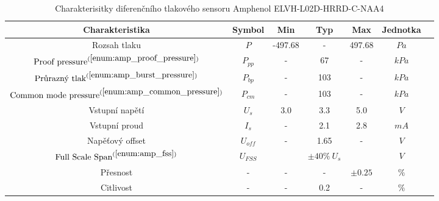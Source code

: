 \begin{table}[H]
    \label{tab:amphenol_properies}
    \caption{Charakterisitky diferenčního tlakového sensoru Amphenol ELVH-L02D-HRRD-C-NAA4 \cite{cite:Allsensors}}
    \centering
    \begin{ctucolortab}
        \begin{tabular}{ccccccc}
            \toprule
            Charakteristika                                                         & Symbol    & Min     & Typ               & Max         & Jednotka & \\ \midrule
            Rozsah tlaku                                                            & $P$       & -497.68 & -                 & 497.68      & $Pa$     & \\
            $\textnormal{Proof pressure}^{(\ref{enum:amp_proof_pressure})}$         & $P_{pp}$  & -       & 67                & -           & $kPa$    & \\
            $\textnormal{Průrazný tlak}^{(\ref{enum:amp_burst_pressure}) }$         & $P_{bp}$  & -       & 103               & -           & $kPa$    & \\
            $\textnormal{Common mode pressure}^{(\ref{enum:amp_common_pressure})} $ & $P_{cm}$  & -       & 103               & -           & $kPa$    & \\
            Vstupní napětí                                                          & $U_{s}$   & 3.0     & 3.3               & 5.0         & $V$      & \\
            Vstupní proud                                                           & $I_{s}$   & -       & 2.1               & 2.8         & $mA$     & \\
            Napěťový offset                                                         & $U_{off}$ & -       & 1.65              & -           & $V$      & \\
            $\textnormal{Full Scale Span}^{(\ref{enum:amp_fss})} $                  & $U_{FSS}$ &         & $\pm 40 \% \ U_s$ &             & $V$      & \\
            Přesnost                                                                & -         & -       & -                 & $\pm 0.25 $ & $\%$     & \\
            Citlivost                                                               & -         & -       & 0.2               & -           & $\%$     & \\
            \bottomrule
        \end{tabular}

\end{ctucolortab}
\end{table}
